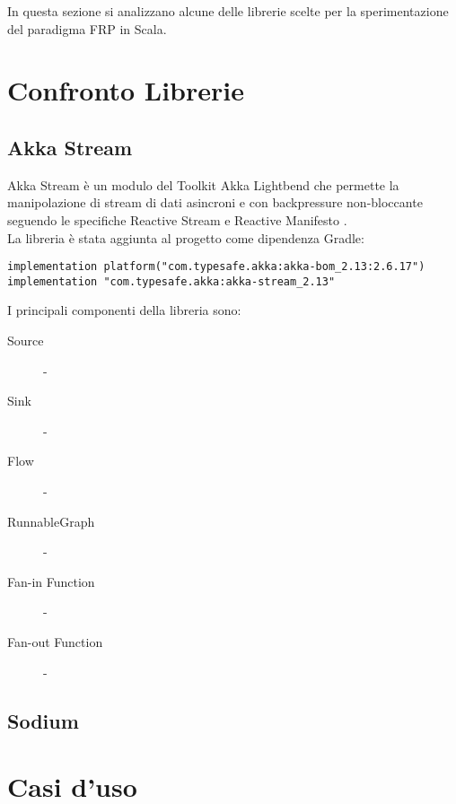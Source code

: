 \documentclass[../main.tex]{subfiles}
\begin{document}
In questa sezione si analizzano alcune delle librerie scelte per la sperimentazione del paradigma FRP in Scala.
\section{Confronto Librerie}
\subsection{Akka Stream}
Akka Stream è un modulo del Toolkit Akka Lightbend che permette la manipolazione di stream di dati asincroni e con backpressure non-bloccante seguendo le specifiche Reactive Stream \cite{frp4} e Reactive Manifesto \cite{frp3}.\\
La libreria è stata aggiunta al progetto come dipendenza Gradle:
\begin{lstlisting}[basicstyle=\small,caption={Dipendenze Akka Stream Gradle},captionpos=b,frame=single]
implementation platform("com.typesafe.akka:akka-bom_2.13:2.6.17")
implementation "com.typesafe.akka:akka-stream_2.13"
\end{lstlisting}

I principali componenti della libreria sono:
\begin{description}
  \item[Source] -
  \item[Sink] - 
  \item[Flow] - 
  \item[RunnableGraph] - 
  \item[Fan-in Function] -
  \item[Fan-out Function] -
\end{description}
\subsection{Sodium}
\section{Casi d'uso}
\end{document}
